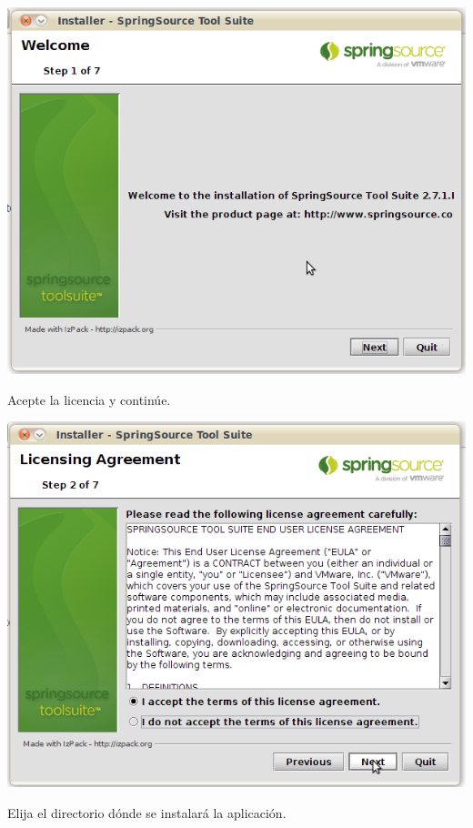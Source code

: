 \documentclass[a4paper,12pt,spanish]{article}
\begin{document}
\begin{center}
\includegraphics[scale=0.45]{ide}
\end{center}

Acepte la licencia y continúe.

\begin{center}
\includegraphics[scale=0.45]{ide2}
\end{center}

Elija el directorio dónde se instalará la aplicación.
\end{document}
